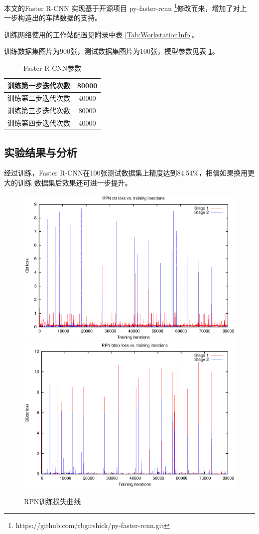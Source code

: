 本文的Faster R-CNN 实现基于开源项目 py-faster-rcnn
\footnote{https://github.com/rbgirshick/py-faster-rcnn.git}修改而来，增加了对上
一步构造出的车牌数据的支持。

训练网络使用的工作站配置见附录中表 \ref{Tab:WorkstationInfo}。

训练数据集图片为900张，测试数据集图片为100张，模型参数见表 \ref{Tab:FasterRCNNArgs}。

\begin{table}[ht]
\centering
\caption{Faster R-CNN参数}\label{Tab:FasterRCNNArgs}
\begin{tabular}{|c|c|}
\hline
训练第一步迭代次数 & 80000 \\
\hline
训练第二步迭代次数 & 40000 \\
\hline 
训练第三步迭代次数 & 80000 \\
\hline 
训练第四步迭代次数 & 40000 \\
\hline
\end{tabular}
\end{table}

\subsection{实验结果与分析}

经过训练，Faster R-CNN在100张测试数据集上精度达到84.54\%，相信如果换用更大的训练
数据集后效果还可进一步提升。

\begin{figure}[ht]
\centering
{}
{\includegraphics[width=.45\linewidth]{./Figure/RPNClsLoss.eps}}
{\includegraphics[width=.45\linewidth]{./Figure/RPNBBoxLoss.eps}}
\caption{RPN训练损失曲线}
\end{figure}

